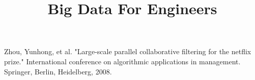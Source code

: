 \documentclass[11pt]{article}
\title{Big Data For Engineers}
\author{}
\date{}
\begin{document}
    \maketitle
    
    


    \begin{thebibliography}{9}
         Zhou, Yunhong, et al. "Large-scale parallel collaborative filtering for the netflix prize."
        International conference on algorithmic applications in management. Springer, Berlin, Heidelberg, 2008.

    \end{thebibliography}
\end{document}
